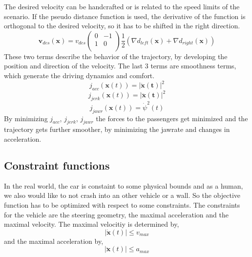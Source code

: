 \documentclass[conference]{IEEEtran}
\begin{document}
The desired velocity can be handcrafted or is related to the speed limits of the scenario. If the pseudo distance function is used, the derivative of the function is orthogonal to the desired velocity, so it has to be shifted in the right direction.
$$
\mathbf{v}_{des} (\mathbf{x}) = v_{des} \begin{pmatrix}
0 & -1 \\
1 & 0 \\
\end{pmatrix} \frac{1}{2} \left(\nabla d_{left}(\mathbf{x}) + \nabla d_{right}(\mathbf{x})\right)
$$
These two terms describe the behavior of the trajectory, by developing the position and direction of the velocity. The last 3 terms are smoothness terms, which generate the driving dynamics and comfort.
$$
j_{acc}(\mathbf{x}(t)) = \left| \mathbf{\ddot{x}(t)} \right|^2 
$$
$$
j_{jerk} (\mathbf{x}(t)) = \left| \mathbf{\dddot{x}(t)} \right|^2 
$$
$$
j_{jawr} (\mathbf{x}(t)) =\dot{\psi}^2(t) 
$$
By minimizing $j_{acc}$, $j_{jerk}$, $j_{jawr}$ the forces to the passengers get minimized and the trajectory gets further smoother, by minimizing the jawrate and changes in acceleration.
\subsection{Constraint functions}
In the real world, the car is constaint to some physical bounds and as a human, we also would like to not crash into an other vehicle or a wall. So the objective function has to be optimized with respect to some constraints. The constraints for the vehicle are the steering geometry, the maximal acceleration and the maximal velocity.
The maximal velocitiy is determined by,
$$|\mathbf{\dot{x}}(t)| \leq v_{max}$$
and the maximal acceleration by, 
$$|\mathbf{\ddot{x}}(t)| \leq a_{max}$$
\end{document}
